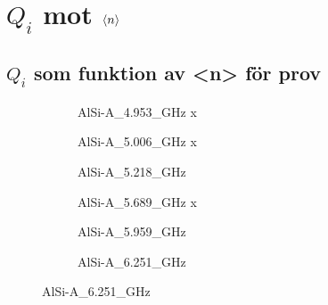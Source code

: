 \documentclass[../../main.tex]{subfiles}
\begin{document}
\chapter{$Q_i$ mot $\expval{n}$}
\label{app:data}

\section{$Q_i$ som funktion av <n> för prov }



\begin{figure}[H]
    \begin{subfigure}{0.33\textwidth}
        \centering
        \setlength{}
        \setlength\figureheight{10em}
        
        \caption{AlSi-A\_4.953\_GHz x}
    \end{subfigure}
    \begin{subfigure}{0.33\textwidth}
        \centering
        \setlength{}
        \setlength\figureheight{10em}
        
        \caption{AlSi-A\_5.006\_GHz x}
    \end{subfigure}
    \begin{subfigure}{0.33\textwidth}
        \centering
        \setlength{}
        \setlength\figureheight{10em}
        
        \caption{AlSi-A\_5.218\_GHz}
    \end{subfigure}

    \begin{subfigure}{0.33\textwidth}
        \centering
        \setlength{}
        \setlength\figureheight{10em}
        
        \caption{AlSi-A\_5.689\_GHz x}
    \end{subfigure}
    \begin{subfigure}{0.33\textwidth}
        \centering
        \setlength{}
        \setlength\figureheight{10em}
        
        \caption{AlSi-A\_5.959\_GHz}
    \end{subfigure}
    \begin{subfigure}{0.33\textwidth}
        \centering
        \setlength{}
        \setlength\figureheight{10em}
        
        \caption{AlSi-A\_6.251\_GHz}
    \end{subfigure}


\end{figure}
\end{document}
